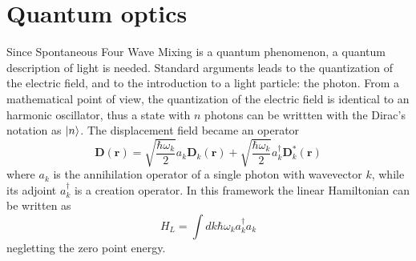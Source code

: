 \documentclass[12pt]{book}
\renewcommand{\r}{\mathbf{r}}
\begin{document}

\section{Quantum optics}
Since Spontaneous Four Wave Mixing is a quantum phenomenon, a quantum description of light is needed. Standard arguments \cite{book:cohen} leads to the quantization of the electric field, and to the introduction to a light particle: the photon. From a mathematical point of view, the quantization of the electric field is identical to an harmonic oscillator, thus a state with $n$ photons can be writtten with the Dirac's notation as $\Ket{n}$. The displacement field became an operator
\begin{equation}
\mathbf{D}(\r) = \sqrt{\frac{\hbar \omega_k}{2}}a_k \mathbf{D}_k(\r) + \sqrt{\frac{\hbar \omega_k}{2}}a_k^\dagger \mathbf{D}^*_k(\r)
\end{equation}
where $a_k$ is the annihilation operator of a single photon with wavevector $k$, while its adjoint $a_k^\dagger$ is a creation operator. In this framework the linear Hamiltonian can be written as
\begin{equation}H_L = \int dk \hbar \omega_k a_k^\dagger a_k  \end{equation}
negletting the zero point energy. 
\end{document}
